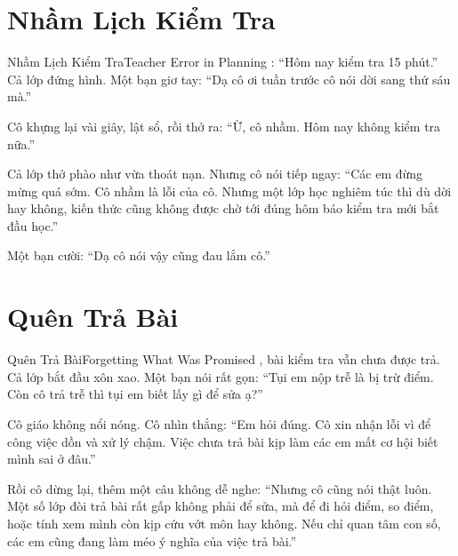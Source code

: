 \section{Nhầm Lịch Kiểm Tra}
\begin{truyen}{Nhầm Lịch Kiểm Tra}{Teacher Error in Planning}
: ``Hôm nay kiểm tra 15 phút.'' Cả lớp đứng hình. Một bạn giơ tay: ``Dạ cô ơi tuần trước cô nói dời sang thứ sáu mà.''

Cô khựng lại vài giây, lật sổ, rồi thở ra: ``Ừ, cô nhầm. Hôm nay không kiểm tra nữa.''

Cả lớp thở phào như vừa thoát nạn. Nhưng cô nói tiếp ngay: ``Các em đừng mừng quá sớm. Cô nhầm là lỗi của cô. Nhưng một lớp học nghiêm túc thì dù dời hay không, kiến thức cũng không được chờ tới đúng hôm báo kiểm tra mới bắt đầu học.''

Một bạn cười: ``Dạ cô nói vậy cũng đau lắm cô.''

\end{truyen}

\section{Quên Trả Bài}
\begin{truyen}{Quên Trả Bài}{Forgetting What Was Promised}
, bài kiểm tra vẫn chưa được trả. Cả lớp bắt đầu xôn xao. Một bạn nói rất gọn: ``Tụi em nộp trễ là bị trừ điểm. Còn cô trả trễ thì tụi em biết lấy gì để sửa ạ?''

Cô giáo không nổi nóng. Cô nhìn thẳng: ``Em hỏi đúng. Cô xin nhận lỗi vì để công việc dồn và xử lý chậm. Việc chưa trả bài kịp làm các em mất cơ hội biết mình sai ở đâu.''

Rồi cô dừng lại, thêm một câu không dễ nghe: ``Nhưng cô cũng nói thật luôn. Một số lớp đòi trả bài rất gấp không phải để sửa, mà để đi hỏi điểm, so điểm, hoặc tính xem mình còn kịp cứu vớt môn hay không. Nếu chỉ quan tâm con số, các em cũng đang làm méo ý nghĩa của việc trả bài.''
\end{truyen}

